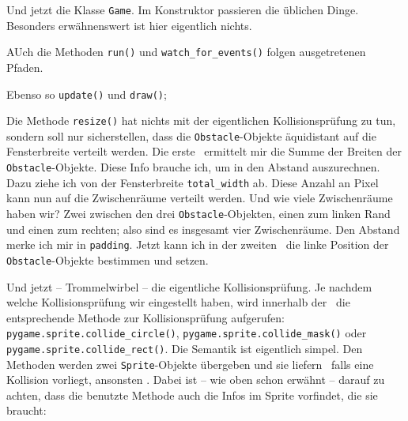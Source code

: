 
Und jetzt die Klasse \texttt{Game}. Im Konstruktor passieren die üblichen Dinge. Besonders erwähnenswert ist hier eigentlich nichts.


AUch die Methoden \texttt{run()} und \texttt{watch\_for\_events()} folgen ausgetretenen Pfaden.


Ebenso so \texttt{update()} und \texttt{draw()};


Die Methode \texttt{resize()} hat nichts mit der eigentlichen Kollisionsprüfung zu tun, sondern soll nur sicherstellen, dass die \texttt{Obstacle}-Objekte äquidistant auf die Fensterbreite verteilt werden. Die erste \forSchleife\ ermittelt mir die Summe der Breiten der \texttt{Obstacle}-Objekte. Diese Info brauche ich, um in  den Abstand auszurechnen. Dazu ziehe ich von der Fensterbreite \texttt{total\_width} ab. Diese Anzahl an Pixel kann nun auf die Zwischenräume verteilt werden. Und wie viele Zwischenräume haben wir? Zwei zwischen den drei \texttt{Obstacle}-Objekten, einen zum linken Rand und einen zum rechten; also sind es insgesamt vier Zwischenräume. Den Abstand merke ich mir in \texttt{padding}. Jetzt kann ich in der zweiten \forSchleife\ die linke Position der \texttt{Obstacle}-Objekte bestimmen und setzen.


Und jetzt -- Trommelwirbel -- die eigentliche Kollisionsprüfung. Je nachdem welche Kollisionsprüfung wir eingestellt haben, wird innerhalb der \forSchleife\ die entsprechende Methode zur Kollisionsprüfung aufgerufen: \texttt{pygame.sprite.collide\_circle()}, \texttt{pygame.\-sprite.\-collide\_mask()} oder \texttt{pygame.sprite.collide\_rect()}. Die Semantik ist eigentlich simpel. Den Methoden werden zwei \texttt{Sprite}-Objekte übergeben und sie liefern \true\ falls eine Kollision vorliegt, ansonsten \false. Dabei ist -- wie oben schon erwähnt -- darauf zu achten, dass die benutzte Methode auch die Infos im Sprite vorfindet, die sie braucht:

